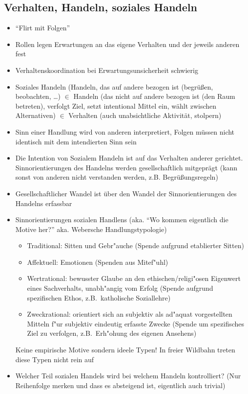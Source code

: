 \documentclass[a4paper, 12pt]{scrartcl}
\begin{document}
\subsection{Verhalten, Handeln, soziales Handeln}
\begin{itemize}
	\item
		\enquote{Flirt mit Folgen}
	\item
		Rollen legen Erwartungen an das eigene Verhalten und der jeweils anderen fest
	\item
		Verhaltenskoordination bei Erwartungsunsicherheit schwierig
	\item
		Soziales Handeln (Handeln, das auf andere bezogen ist (begrüßen, beobachten, \dots) $\in$ Handeln (das nicht auf andere bezogen ist (den Raum betreten), verfolgt Ziel, setzt intentional Mittel ein, wählt zwischen Alternativen) $\in$ Verhalten (auch unabsichtliche Aktivität, stolpern)
	\item
		Sinn einer Handlung wird von anderen interpretiert, Folgen müssen nicht identisch mit dem intendierten Sinn sein
	\item
		Die Intention von Sozialem Handeln ist auf das Verhalten anderer gerichtet. Sinnorientierungen des Handelns werden gesellschaftlich mitgeprägt (kann sonst von anderen nicht verstanden werden, z.B. Begrüßungsregeln)
	\item
		Gesellschaftlicher Wandel ist über den Wandel der Sinnorientierungen des Handelns erfassbar

	\item
		Sinnorientierungen sozialen Handlens (aka. \enquote{Wo kommen eigentlich die Motive her?} aka. Webersche Handlungstypologie)
		\begin{itemize}
			\item
				Traditional: Sitten und Gebr"auche (Spende aufgrund etablierter Sitten)
			\item
				Affektuell: Emotionen (Spenden aus Mitef"uhl)
			\item
				Wertrational: bewusster Glaube an den ethischen/religi"osen Eigenwert eines Sachverhalts, unabh"angig vom Erfolg (Spende aufgrund spezifischen Ethos, z.B.\ katholische Soziallehre)
			\item
				Zweckrational: orientiert sich an subjektiv als ad"aquat vorgestellten Mitteln f"ur subjektiv eindeutig erfasste Zwecke (Spende um spezifisches Ziel zu verfolgen, z.B.\ Erh"ohung des eigenen Ansehens)
		\end{itemize}
		Keine empirische Motive sondern ideele Typen! In freier Wildbahn treten diese Typen nicht rein auf
	\item
		Welcher Teil sozialen Handels wird bei welchem Handeln kontrolliert? (Nur Reihenfolge merken und dass es absteigend ist, eigentlich auch trivial)


\end{itemize}
\end{document}
